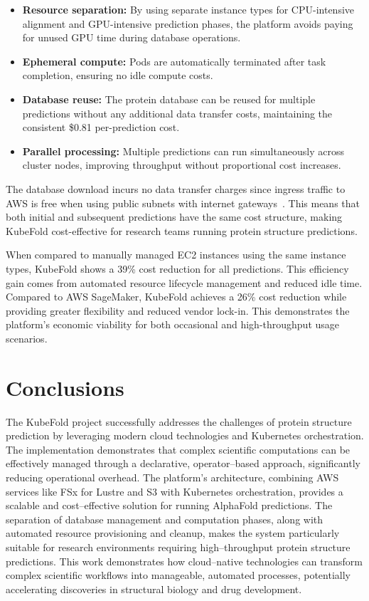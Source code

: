 \begin{itemize}
    \item \textbf{Resource separation:} By using separate instance types for CPU-intensive alignment and GPU-intensive prediction phases, the platform avoids paying for unused GPU time during database operations.
    
    \item \textbf{Ephemeral compute:} Pods are automatically terminated after task completion, ensuring no idle compute costs.
    
    \item \textbf{Database reuse:} The protein database can be reused for multiple predictions without any additional data transfer costs, maintaining the consistent \$0.81 per-prediction cost.
    
    \item \textbf{Parallel processing:} Multiple predictions can run simultaneously across cluster nodes, improving throughput without proportional cost increases.
\end{itemize}

The database download incurs no data transfer charges since ingress traffic to AWS is free when using public subnets with internet gateways~\cite{aws-ec2-pricing}. This means that both initial and subsequent predictions have the same cost structure, making KubeFold cost-effective for research teams running protein structure predictions.

When compared to manually managed EC2 instances using the same instance types, KubeFold shows a 39\% cost reduction for all predictions. This efficiency gain comes from automated resource lifecycle management and reduced idle time. Compared to AWS SageMaker, KubeFold achieves a 26\% cost reduction while providing greater flexibility and reduced vendor lock-in. This demonstrates the platform's economic viability for both occasional and high-throughput usage scenarios.

\section{Conclusions}

The KubeFold project successfully addresses the challenges of protein structure prediction by leveraging modern cloud technologies and Kubernetes orchestration.
The implementation demonstrates that complex scientific computations can be effectively managed through a declarative, operator--based approach, significantly reducing operational overhead.
The platform's architecture, combining AWS services like FSx for Lustre and S3 with Kubernetes orchestration, provides a scalable and cost--effective solution for running AlphaFold predictions.
The separation of database management and computation phases, along with automated resource provisioning and cleanup, makes the system particularly suitable for research environments requiring high--throughput protein structure predictions.
This work demonstrates how cloud--native technologies can transform complex scientific workflows into manageable, automated processes, potentially accelerating discoveries in structural biology and drug development.